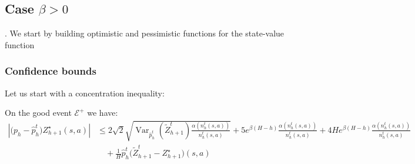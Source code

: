 \documentclass[final,12pt]{colt2026} %
\begin{document}
\subsection{Case \texorpdfstring{$\beta > 0$}{beta > 0}}\label{beta_positive}.
We start by building optimistic and pessimistic functions for the state-value function
\subsubsection{Confidence bounds}
Let us start with a concentration inequality:
\begin{lemma}\label{concentration_positive}
On the good event $\mathcal{E}^+$ we have:
\begin{align*}
    | \big(p_h - \widehat{p}_h^t\big)Z_{h+1}^{\star}(s,a)| &\leq 2\sqrt{2}\sqrt{\operatorname{Var}_{\widehat{p}_h^t}(\widetilde  Z_{h+1}^t)\frac{\alpha(n_h^t(s,a))}{n_h^t(s,a)}} + 5 e^{\beta  (H - h)} \frac{\alpha(n_h^t(s,a))}{n_h^t(s,a)} + 4 He^{ \beta  (H - h)} \frac{\alpha(n_h^t(s,a))}{n_h^t(s,a)}\\ &\quad+  \frac{1}{H} \widehat{p}_h^t\Big(\widetilde{Z}^t_{h+1} - Z_{h+1}^{\star}\Big)(s,a)
\end{align*}
\end{lemma}
\end{document}
